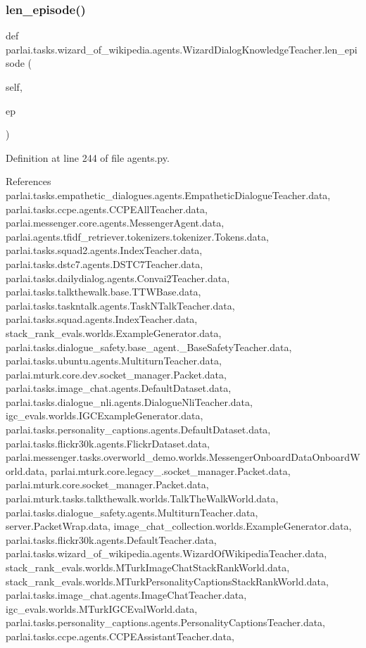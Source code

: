 \subsubsection{\texorpdfstring{len\+\_\+episode()}{len\_episode()}}
{\footnotesize\ttfamily def parlai.\+tasks.\+wizard\+\_\+of\+\_\+wikipedia.\+agents.\+Wizard\+Dialog\+Knowledge\+Teacher.\+len\+\_\+episode (\begin{DoxyParamCaption}\item[{}]{self,  }\item[{}]{ep }\end{DoxyParamCaption})}



Definition at line 244 of file agents.\+py.



References parlai.\+tasks.\+empathetic\+\_\+dialogues.\+agents.\+Empathetic\+Dialogue\+Teacher.\+data, parlai.\+tasks.\+ccpe.\+agents.\+C\+C\+P\+E\+All\+Teacher.\+data, parlai.\+messenger.\+core.\+agents.\+Messenger\+Agent.\+data, parlai.\+agents.\+tfidf\+\_\+retriever.\+tokenizers.\+tokenizer.\+Tokens.\+data, parlai.\+tasks.\+squad2.\+agents.\+Index\+Teacher.\+data, parlai.\+tasks.\+dstc7.\+agents.\+D\+S\+T\+C7\+Teacher.\+data, parlai.\+tasks.\+dailydialog.\+agents.\+Convai2\+Teacher.\+data, parlai.\+tasks.\+talkthewalk.\+base.\+T\+T\+W\+Base.\+data, parlai.\+tasks.\+taskntalk.\+agents.\+Task\+N\+Talk\+Teacher.\+data, parlai.\+tasks.\+squad.\+agents.\+Index\+Teacher.\+data, stack\+\_\+rank\+\_\+evals.\+worlds.\+Example\+Generator.\+data, parlai.\+tasks.\+dialogue\+\_\+safety.\+base\+\_\+agent.\+\_\+\+Base\+Safety\+Teacher.\+data, parlai.\+tasks.\+ubuntu.\+agents.\+Multiturn\+Teacher.\+data, parlai.\+mturk.\+core.\+dev.\+socket\+\_\+manager.\+Packet.\+data, parlai.\+tasks.\+image\+\_\+chat.\+agents.\+Default\+Dataset.\+data, parlai.\+tasks.\+dialogue\+\_\+nli.\+agents.\+Dialogue\+Nli\+Teacher.\+data, igc\+\_\+evals.\+worlds.\+I\+G\+C\+Example\+Generator.\+data, parlai.\+tasks.\+personality\+\_\+captions.\+agents.\+Default\+Dataset.\+data, parlai.\+tasks.\+flickr30k.\+agents.\+Flickr\+Dataset.\+data, parlai.\+messenger.\+tasks.\+overworld\+\_\+demo.\+worlds.\+Messenger\+Onboard\+Data\+Onboard\+World.\+data, parlai.\+mturk.\+core.\+legacy\+\_.\+socket\+\_\+manager.\+Packet.\+data, parlai.\+mturk.\+core.\+socket\+\_\+manager.\+Packet.\+data, parlai.\+mturk.\+tasks.\+talkthewalk.\+worlds.\+Talk\+The\+Walk\+World.\+data, parlai.\+tasks.\+dialogue\+\_\+safety.\+agents.\+Multiturn\+Teacher.\+data, server.\+Packet\+Wrap.\+data, image\+\_\+chat\+\_\+collection.\+worlds.\+Example\+Generator.\+data, parlai.\+tasks.\+flickr30k.\+agents.\+Default\+Teacher.\+data, parlai.\+tasks.\+wizard\+\_\+of\+\_\+wikipedia.\+agents.\+Wizard\+Of\+Wikipedia\+Teacher.\+data, stack\+\_\+rank\+\_\+evals.\+worlds.\+M\+Turk\+Image\+Chat\+Stack\+Rank\+World.\+data, stack\+\_\+rank\+\_\+evals.\+worlds.\+M\+Turk\+Personality\+Captions\+Stack\+Rank\+World.\+data, parlai.\+tasks.\+image\+\_\+chat.\+agents.\+Image\+Chat\+Teacher.\+data, igc\+\_\+evals.\+worlds.\+M\+Turk\+I\+G\+C\+Eval\+World.\+data, parlai.\+tasks.\+personality\+\_\+captions.\+agents.\+Personality\+Captions\+Teacher.\+data, parlai.\+tasks.\+ccpe.\+agents.\+C\+C\+P\+E\+Assistant\+Teacher.\+data, 